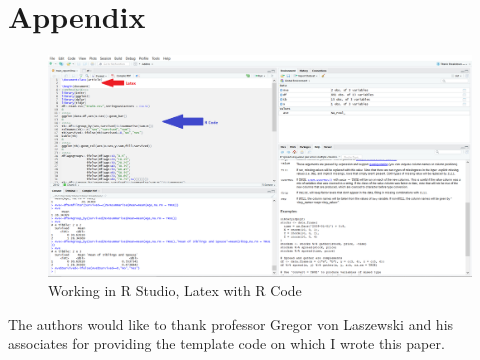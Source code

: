\documentclass[sigconf]{acmart}
\begin{document}
\section{Appendix} 
 \begin{figure}[htb]
  \centering
  \includegraphics[width=1.0\columnwidth]{paper2/Latex With R Code in R Studio.png}
  \caption{Working in R Studio, Latex with R Code
  \cite{Tibenkana and Driscoll}}
  \label{fig:Latex With R Code in R Studio} 
\end{figure}
 
\begin{acks}

The authors would like to thank professor Gregor von Laszewski and his associates for providing the template code on which I wrote this paper.

\end{acks}


 
\end{document}
